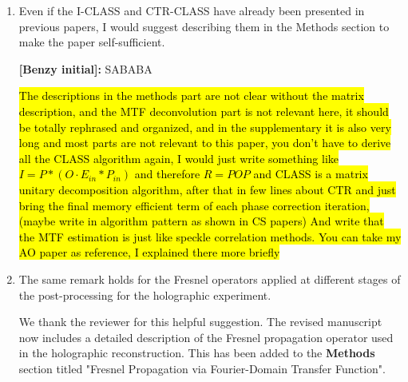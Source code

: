 \documentclass[12pt]{article}
\newcommand{\hlred}[1]{\sethlcolor{red!30}\hl{#1}}
\newenvironment{reviewercomment}
    {\begin{tcolorbox}[width=\linewidth,colback=gray!5,colframe=commentcolor!50,title=Reviewer Comment,left=5pt,right=5pt]}
    {\end{tcolorbox}}
\newenvironment{solved_reviewercomment}
    {\begin{tcolorbox}[width=\linewidth,colback=gray!5,colframe=solved_commentcolor!50,title=Reviewer Comment,left=5pt,right=5pt]}
    {\end{tcolorbox}}
\newenvironment{ourresponse}
    {\begin{tcolorbox}[width=\linewidth,breakable,enhanced,colback=gray!5,colframe=responsecolor!50,title=Response,left=5pt,right=5pt]}
    {\end{tcolorbox}}
\begin{document}
\begin{enumerate}[label=\arabic*.]
\begin{ourresponse}
\begin{quote}




\end{quote}
\end{ourresponse}
    
    \item \leavevmode\vspace{-\baselineskip}
    \begin{reviewercomment}
        Even if the I-CLASS and CTR-CLASS have already been presented in previous papers, I would suggest describing them in the Methods section to make the paper self-sufficient. 
    \end{reviewercomment}
    \begin{ourresponse}
        \textbf{[Benzy initial]:}
        SABABA
    \end{ourresponse}
    \hlred{The descriptions in the methods part are not clear without the matrix description, and the MTF deconvolution part is not relevant here, it should be totally rephrased and organized, and in the supplementary it is also very long and most parts are not relevant to this paper, you don't have to derive all the CLASS algorithm again, I would just write something like $I=P*(O\cdot E_{in}*P_{in})$ and therefore $R=POP$ and CLASS is a matrix unitary decomposition algorithm, after that in few lines about CTR and just bring the final memory efficient term of each phase correction iteration, (maybe write in algorithm pattern as shown in CS papers) 
    And write that the MTF estimation is just like speckle correlation methods. You can take my AO paper as reference, I explained there more briefly}
    \item \leavevmode\vspace{-\baselineskip}
    \begin{solved_reviewercomment}
        The same remark holds for the Fresnel operators applied at different stages of the post-processing for the holographic experiment.
    \end{solved_reviewercomment}

    

    \begin{ourresponse}
        We thank the reviewer for this helpful suggestion. The revised manuscript now includes a detailed description of the Fresnel propagation operator used in the holographic reconstruction. This has been added to the \textbf{Methods} section titled "Fresnel Propagation via Fourier-Domain Transfer Function".
        \begin{quote}

\end{quote}
\end{ourresponse}
\end{enumerate}
\end{document}
